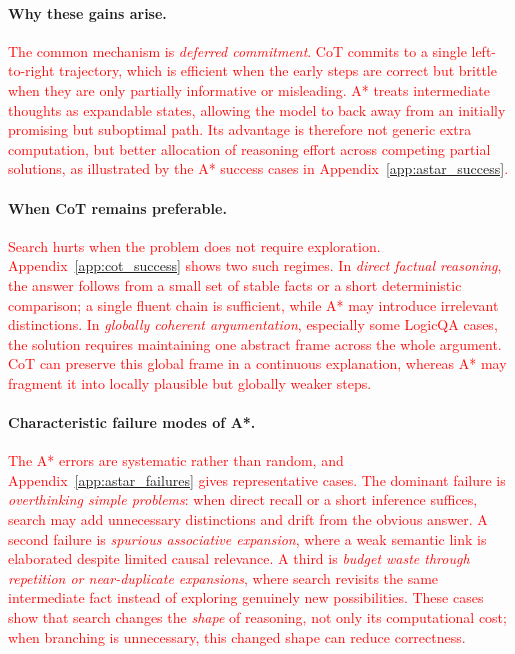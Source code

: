 \documentclass[11pt]{article}
\begin{document}
\paragraph{Why these gains arise.}
\textcolor{red}{The common mechanism is \emph{deferred commitment}. CoT commits to a single left-to-right trajectory, which is efficient when the early steps are correct but brittle when they are only partially informative or misleading. A* treats intermediate thoughts as expandable states, allowing the model to back away from an initially promising but suboptimal path. Its advantage is therefore not generic extra computation, but better allocation of reasoning effort across competing partial solutions, as illustrated by the A* success cases in Appendix~\ref{app:astar_success}.}

\paragraph{When CoT remains preferable.}
\textcolor{red}{Search hurts when the problem does not require exploration. Appendix~\ref{app:cot_success} shows two such regimes. In \emph{direct factual reasoning}, the answer follows from a small set of stable facts or a short deterministic comparison; a single fluent chain is sufficient, while A* may introduce irrelevant distinctions. In \emph{globally coherent argumentation}, especially some LogicQA cases, the solution requires maintaining one abstract frame across the whole argument. CoT can preserve this global frame in a continuous explanation, whereas A* may fragment it into locally plausible but globally weaker steps.}

\paragraph{Characteristic failure modes of A*.}
\textcolor{red}{The A* errors are systematic rather than random, and Appendix~\ref{app:astar_failures} gives representative cases. The dominant failure is \emph{overthinking simple problems}: when direct recall or a short inference suffices, search may add unnecessary distinctions and drift from the obvious answer. A second failure is \emph{spurious associative expansion}, where a weak semantic link is elaborated despite limited causal relevance. A third is \emph{budget waste through repetition or near-duplicate expansions}, where search revisits the same intermediate fact instead of exploring genuinely new possibilities. These cases show that search changes the \emph{shape} of reasoning, not only its computational cost; when branching is unnecessary, this changed shape can reduce correctness.}
\end{document}
